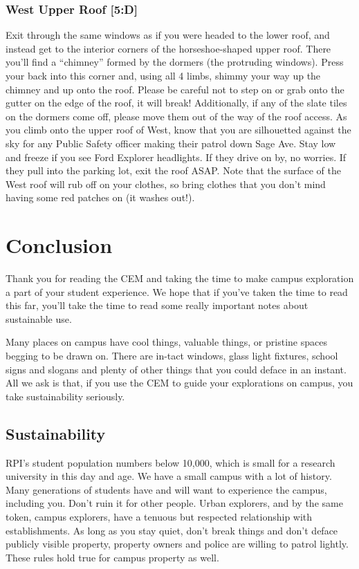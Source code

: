 \documentclass{article}
\begin{document}
\subsubsection{West Upper Roof [5:D]}
Exit through the same windows as if you were headed to the lower roof, and instead get to the interior corners of the horseshoe-shaped upper roof. There you’ll find a “chimney” formed by the dormers (the protruding windows). Press your back into this corner and, using all 4 limbs, shimmy your way up the chimney and up onto the roof. Please be careful not to step on or grab onto the gutter on the edge of the roof, it will break! Additionally, if any of the slate tiles on the dormers come off, please move them out of the way of the roof access. As you climb onto the upper roof of West, know that you are silhouetted against the sky for any Public Safety officer making their patrol down Sage Ave. Stay low and freeze if you see Ford Explorer headlights. If they drive on by, no worries. If they pull into the parking lot, exit the roof ASAP. Note that the surface of the West roof will rub off on your clothes, so bring clothes that you don’t mind having some red patches on (it washes out!).

\section{Conclusion}

Thank you for reading the CEM and taking the time to make campus exploration a part of your student experience. We hope that if you’ve taken the time to read this far, you’ll take the time to read some really important notes about sustainable use.

Many places on campus have cool things, valuable things, or pristine spaces begging to be drawn on. There are in-tact windows, glass light fixtures, school signs and slogans and plenty of other things that you could deface in an instant. All we ask is that, if you use the CEM to guide your explorations on campus, you take sustainability seriously.
\subsection{Sustainability}

RPI’s student population numbers below 10,000, which is small for a research university in this day and age. We have a small campus with a lot of history. Many generations of students have and will want to experience the campus, including you. Don’t ruin it for other people. Urban explorers, and by the same token, campus explorers, have a tenuous but respected relationship with establishments. As long as you stay quiet, don’t break things and don’t deface publicly visible property, property owners and police are willing to patrol lightly. These rules hold true for campus property as well. 
\end{document}
